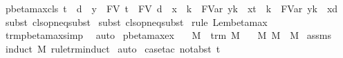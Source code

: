 \begin{isabellebody}
\ pbeta{\isacharunderscore}max{\isacharunderscore}cls{\isacharcolon}\ {\isachardoublequoteopen}t\ {\isachargreater}{\isachargreater}{\isachargreater}\ d\ {\isasymLongrightarrow}\ y\ {\isasymnotin}\ FV\ t\ {\isasymunion}\ FV\ d\ {\isasymunion}\ {\isacharbraceleft}x{\isacharbraceright}\ {\isasymLongrightarrow}\ {\isacharbraceleft}k\ {\isasymrightarrow}\ FVar\ y{\isacharbraceright}{\isacharbraceleft}k\ {\isacharless}{\isacharminus}\ x{\isacharbraceright}t\ {\isachargreater}{\isachargreater}{\isachargreater}\ {\isacharbraceleft}k\ {\isasymrightarrow}\ FVar\ y{\isacharbraceright}{\isacharbraceleft}k\ {\isacharless}{\isacharminus}\ x{\isacharbraceright}d{\isachardoublequoteclose}\isanewline
%
\isadelimproof
%
\endisadelimproof
%
\isatagproof
{}\isamarkupfalse%
\ {\isacharparenleft}subst\ cls{\isacharunderscore}opn{\isacharunderscore}eq{\isacharunderscore}subst{\isacharparenright}\isanewline
{}\isamarkupfalse%
\isanewline
{}\isamarkupfalse%
\ {\isacharparenleft}subst\ cls{\isacharunderscore}opn{\isacharunderscore}eq{\isacharunderscore}subst{\isacharparenright}\isanewline
{}\isamarkupfalse%
\isanewline
{}\isamarkupfalse%
\ {\isacharparenleft}rule\ Lem{}{\isacharunderscore}{}{\isacharunderscore}{}{\isacharunderscore}beta{\isacharunderscore}max{\isacharparenright}\isanewline
{}\isamarkupfalse%
\ trm{\isacharunderscore}pbeta{\isacharunderscore}max{\isacharunderscore}simp{}\ \isamarkupfalse%
\ auto%
\endisatagproof
{\isafoldproof}%
%
\isadelimproof
\isanewline
%
\endisadelimproof
\isanewline
{}\isamarkupfalse%
\ pbeta{\isacharunderscore}max{\isacharunderscore}ex{\isacharcolon}\isanewline
\ \ \ M\ \ {\isachardoublequoteopen}trm\ M{\isachardoublequoteclose}\isanewline
\ \ \ {\isachardoublequoteopen}{\isasymexists}M{\isacharprime}{\isachardot}\ M\ {\isachargreater}{\isachargreater}{\isachargreater}\ M{\isacharprime}{\isachardoublequoteclose}\isanewline
%
\isadelimproof
%
\endisadelimproof
%
\isatagproof
{}\isamarkupfalse%
\ assms\ \isamarkupfalse%
\ {\isacharparenleft}induct\ M\ rule{\isacharcolon}trm{\isachardot}induct{\isacharparenright}\isanewline
{}\isamarkupfalse%
\ auto\isanewline
{}\isamarkupfalse%
\ {\isacharparenleft}case{\isacharunderscore}tac\ {\isachardoublequoteopen}not{\isacharunderscore}abst\ t{}{\isachardoublequoteclose}{\isacharparenright}\isanewline

\end{isabellebody}
